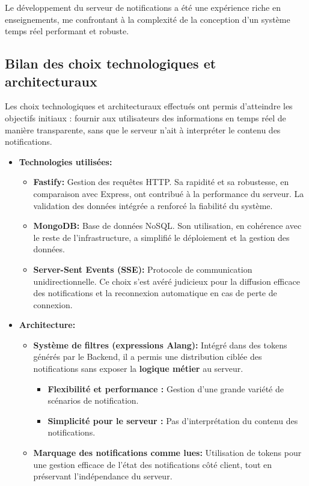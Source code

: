 
Le développement du serveur de notifications a été une expérience riche en
enseignements, me confrontant à la complexité de la conception d'un système
temps réel performant et robuste.

\subsection{Bilan des choix technologiques et architecturaux}

Les choix technologiques et architecturaux effectués ont permis d'atteindre les
objectifs initiaux : fournir aux utilisateurs des informations en temps réel
de manière transparente, sans que le serveur n'ait à interpréter le contenu
des notifications.

\begin{itemize}
\item {\bf Technologies utilisées:}
	\begin{itemize}
	    \item {\bf Fastify:} Gestion des requêtes HTTP. Sa rapidité et sa robustesse,
en comparaison avec Express, ont contribué à la performance du serveur. La
validation des données intégrée a renforcé la fiabilité du système.
	    \item {\bf MongoDB:} Base de données NoSQL. Son utilisation, en cohérence avec le
reste de l'infrastructure, a simplifié le déploiement et la gestion des données.
	    \item {\bf Server-Sent Events (SSE):} Protocole de communication unidirectionnelle. Ce
choix s'est avéré judicieux pour la diffusion efficace des notifications et la
reconnexion automatique en cas de perte de connexion.
	\end{itemize}
\item {\bf Architecture:}
	\begin{itemize}
    \item {\bf Système de filtres (expressions Alang):} Intégré dans des tokens
générés par le Backend, il a permis une distribution ciblée des notifications
sans exposer la {\bf logique métier} au serveur.
		\begin{itemize}
        \item {\bf Flexibilité et performance :} Gestion d'une grande variété de
scénarios de notification.
        \item {\bf Simplicité pour le serveur :} Pas d'interprétation du contenu
des notifications.
		\end{itemize}
    \item {\bf Marquage des notifications comme lues:} Utilisation de tokens
pour une gestion efficace de l'état des notifications côté client, tout en
préservant l'indépendance du serveur.
	\end{itemize}
\end{itemize}

